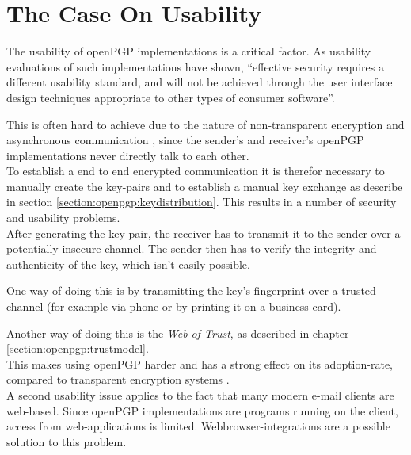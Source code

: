
\section{The Case On Usability} \label{section:concerns:usability}


The usability of openPGP implementations is a critical factor. As usability evaluations of such implementations \cite{Whitten1999} have shown, ``effective security requires a different usability standard, and will not be achieved through the user interface design techniques appropriate to other types of consumer software''.

This is often hard to achieve due to the nature of non-transparent encryption and asynchronous communication \citep[section 2.1]{RFC4880}, since the sender's and receiver's openPGP implementations never directly talk to each other. \\

To establish a end to end encrypted communication it is therefor necessary to manually create the key-pairs and to establish a manual key exchange as describe in section \ref{section:openpgp:keydistribution}. This results in a number of security and usability problems.  \\


After generating the key-pair, the receiver has to transmit it to the sender over a potentially insecure channel. The sender then has to verify the integrity and authenticity of the key, which isn't easily possible.

One way of doing this is by transmitting the key's fingerprint over a trusted channel (for example via phone or by printing it on a business card). 

Another way of doing this is the \textit{Web of Trust}, as described in chapter \ref{section:openpgp:trustmodel}. \\

This makes using openPGP harder and has a strong effect on its adoption-rate, compared to transparent encryption systems \cite{Green2014}. \\

A second usability issue applies to the fact that many modern e-mail clients are web-based. Since openPGP implementations are programs running on the client, access from web-applications is limited. Webbrowser-integrations are a possible solution to this problem. 

